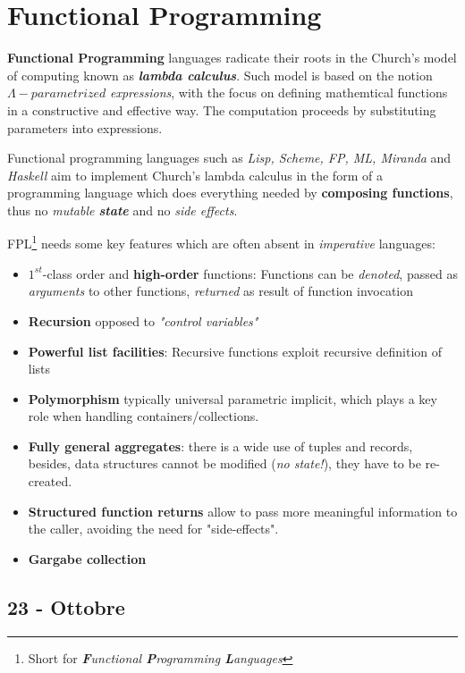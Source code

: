 \chapter{Functional Programming}
\textbf{Functional Programming} languages radicate their roots in the Church's model of computing known as \textbf{\textit{lambda calculus}}.
Such model is based on the notion $\Lambda-\textit{parametrized}$ \textit{expressions},
with the focus on defining mathemtical functions in a constructive and effective way.
The computation proceeds by substituting parameters into expressions.\nl

Functional programming languages such as \textit{Lisp, Scheme, FP, ML, Miranda} and \textit{Haskell} aim to implement Church's lambda calculus in the form of a programming language which does everything needed by \textbf{composing functions}, thus no \textit{mutable \textbf{state}} and no \textit{side effects}.

FPL\footnote{Short for \textit{\textbf{F}unctional \textbf{P}rogramming \textbf{L}anguages}} needs some key features which are often absent in \textit{imperative} languages:
\begin{itemize}
   \item $1^{st}$-class order and \textbf{high-order} functions:
   Functions can be \textit{denoted}, passed as \textit{arguments} to other functions, \textit{returned} as result of function invocation
   \item \textbf{Recursion} opposed to \textit{"control variables"}
   \item \textbf{Powerful list facilities}: Recursive functions exploit recursive definition of lists
   \item \textbf{Polymorphism} typically universal parametric
   implicit, 
   which plays a key role when handling containers/collections.
   \item \textbf{Fully general aggregates}:
   there is a wide use of tuples and records,
   besides,
   data structures cannot be modified (\textit{no state!}), they have to be re-created.
   \item \textbf{Structured function returns} allow to pass more meaningful information to the caller, avoiding the need for "side-effects".
   \item \textbf{Gargabe collection}
\end{itemize}

\section*{23 - Ottobre}
